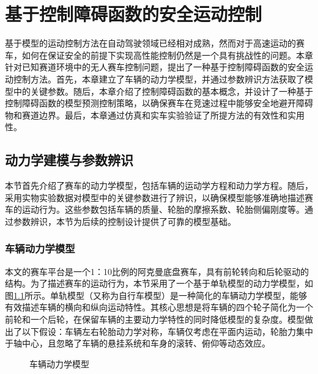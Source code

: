 \chapter{基于控制障碍函数的安全运动控制}
基于模型的运动控制方法在自动驾驶领域已经相对成熟，然而对于高速运动的赛车，如何在保证安全的前提下实现高性能控制仍然是一个具有挑战性的问题。本章针对已知赛道环境中的无人赛车控制问题，提出了一种基于控制障碍函数的安全运动控制方法。首先，本章建立了车辆的动力学模型，并通过参数辨识方法获取了模型中的关键参数。随后，本章介绍了控制障碍函数的基本概念，并设计了一种基于控制障碍函数的模型预测控制策略，以确保赛车在竞速过程中能够安全地避开障碍物和赛道边界。最后，本章通过仿真和实车实验验证了所提方法的有效性和实用性。
\section{动力学建模与参数辨识}
本节首先介绍了赛车的动力学模型，包括车辆的运动学方程和动力学方程。随后，采用实物实验数据对模型中的关键参数进行了辨识，以确保模型能够准确地描述赛车的运动行为。这些参数包括车辆的质量、轮胎的摩擦系数、轮胎侧偏刚度等。通过参数辨识，本节为后续的控制设计提供了可靠的模型基础。
\subsection{车辆动力学模型}
本文的赛车平台是一个1：10比例的阿克曼底盘赛车，具有前轮转向和后轮驱动的结构。为了描述赛车的运动行为，本节采用了一个基于单轨模型的动力学模型\cite{rajamani2006vehicle}，如图\ref{fig:car-model}所示。单轨模型（又称为自行车模型）是一种简化的车辆动力学模型，能够有效描述车辆的横向和纵向运动特性。其核心思想是将车辆的四个轮子简化为一个前轮和一个后轮，在保留车辆的主要动力学特性的同时降低模型的复杂度。模型做出了以下假设：车辆左右轮胎动力学对称，车辆仅考虑在平面内运动，轮胎力集中于轴中心，且忽略了车辆的悬挂系统和车身的滚转、俯仰等动态效应。
\begin{figure}[ht]
    \centering
    
    \caption{车辆动力学模型}
    \label{fig:car-model}
\end{figure}

